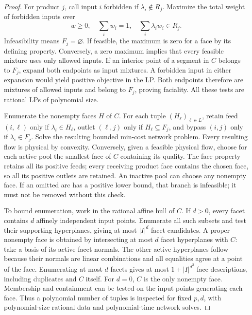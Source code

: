 \begin{proof}
For product $j$, call input $i$ forbidden if $\lambda_i\notin R_j$.
Maximize the total weight of forbidden inputs over
\[
 w\ge0,\quad\sum_iw_i=1,\quad\sum_i\lambda_iw_i\in R_j.
\]
Infeasibility means $F_j=\varnothing$. If feasible, the maximum is zero
for a face by its defining property. Conversely, a zero maximum implies
that every feasible mixture uses only allowed inputs. If an interior
point of a segment in $C$ belongs to $F_j$, expand both endpoints as
input mixtures. A forbidden input in either expansion would yield
positive objective in the LP. Both endpoints therefore are mixtures of
allowed inputs and belong to $F_j$, proving faciality. All these tests
are rational LPs of polynomial size.

Enumerate the nonempty faces $H$ of $C$. For each tuple $(H_\ell)_{\ell\in L}$,
retain feed $(i,\ell)$ only if $\lambda_i\in H_\ell$, outlet $(\ell,j)$
only if $H_\ell\subseteq F_j$, and bypass $(i,j)$ only if
$\lambda_i\in F_j$. Solve the resulting bounded min-cost network
problem. Every resulting flow is physical by convexity. Conversely,
given a feasible physical flow, choose for each active pool the smallest
face of $C$ containing its quality. The face property retains all its
positive feeds; every receiving product face contains the chosen face,
so all its positive outlets are retained. An inactive pool can choose
any nonempty face. If an omitted arc has a positive lower bound, that
branch is infeasible; it must not be removed without this check.

To bound enumeration, work in the rational affine hull of $C$. If
$d>0$, every facet contains $d$ affinely independent input points.
Enumerate all such subsets and test their supporting hyperplanes, giving
at most $|I|^d$ facet candidates. A proper nonempty face is obtained by
intersecting at most $d$ facet hyperplanes with $C$: take a basis of
its active facet normals. The other active hyperplanes follow because
their normals are linear combinations and all equalities agree at a
point of the face. Enumerating at most $d$ facets gives at most
$1+|I|^{d^2}$ face descriptions, including duplicates and $C$ itself.
For $d=0$, $C$ is the only nonempty face. Membership and containment can
be tested on the input points generating each face. Thus a polynomial
number of tuples is inspected for fixed $p,d$, with polynomial-size
rational data and polynomial-time network solves.
\end{proof}

